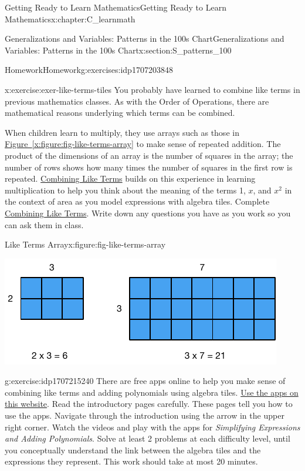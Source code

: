 \documentclass[oneside,10pt,]{book}
\newcommand{\xreffont}{\relax}
\newcommand{\pubtitle}[1]{\textsl{#1}}
\numberwithin{equation}{chapter}
\begin{document}
\begin{chapterptx}{Getting Ready to Learn Mathematics}{}{Getting Ready to Learn Mathematics}{}{}{x:chapter:C_learnmath}
\begin{sectionptx}{Generalizations and Variables: Patterns in the 100s Chart}{}{Generalizations and Variables: Patterns in the 100s Chart}{}{}{x:section:S_patterns_100}
\begin{exercises-subsection}{Homework}{}{Homework}{}{}{g:exercises:idp1707203848}
\begin{divisionexercise}{3}{}{}{x:exercise:exer-like-terms-tiles}
You probably have learned to combine like terms in previous mathematics classes. As with the Order of Operations, there are mathematical reasons underlying which terms can be combined.%
\par
When children learn to multiply, they use arrays such as those in \hyperref[x:figure:fig-like-terms-array]{Figure~{\xreffont\ref{x:figure:fig-like-terms-array}}} to make sense of repeated addition. The product of the dimensions of an array is the number of squares in the array; the number of rows shows how many times the number of squares in the first row is repeated. \hyperref[x:worksheet:act-like-terms]{Combining Like Terms} builds on this experience in learning multiplication to help you think about the meaning of the terms 1, \(x\), and \(x^2\) in the context of area as you model expressions with algebra tiles. Complete \hyperref[x:worksheet:act-like-terms]{Combining Like Terms}. Write down any questions you have as you work so you can ask them in class.%
\begin{figureptx}{Like Terms Array}{x:figure:fig-like-terms-array}{}%
\begin{image}{0.25}{0.5}{0.25}%
\includegraphics[width=\linewidth]{external/like-terms-array.pdf}
\end{image}%
\tcblower
\end{figureptx}%
\end{divisionexercise}%
\begin{divisionexercise}{4}{}{}{g:exercise:idp1707215240}%
There are free apps online to help you make sense of combining like terms and adding polynomials using algebra tiles. \href{http://media.mivu.org/mvu_pd/a4a/homework/index.html}{Use the apps on this website}\footnotemark{}. Read the introductory pages carefully. These pages tell you how to use the apps. Navigate through the introduction using the arrow in the upper right corner. Watch the videos and play with the apps for \pubtitle{Simplifying Expressions and Adding Polynomials}. Solve at least 2 problems at each difficulty level, until you conceptually understand the link between the algebra tiles and the expressions they represent. This work should take at most 20 minutes.%

\end{divisionexercise}
\end{exercises-subsection}
\end{sectionptx}
\end{chapterptx}
\end{document}
